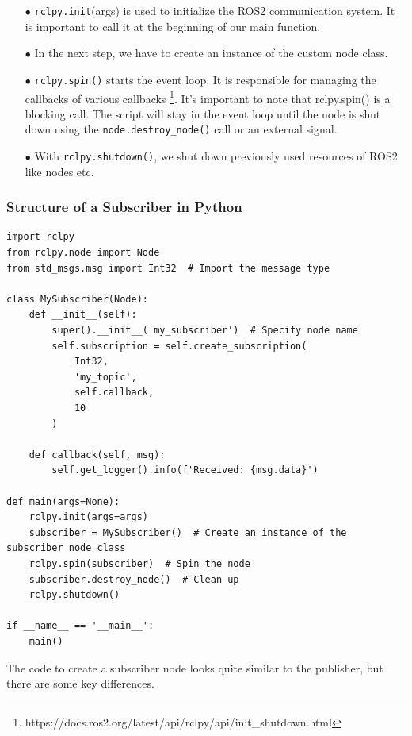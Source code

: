 \documentclass{article}
\begin{document}
\begin{enumerate}
\item[$\bullet$] \texttt{rclpy.init}(args) is used to initialize the ROS2 communication system. It is important to call it at the beginning of our main function.

\item[$\bullet$] In the next step, we have to create an instance of the custom node class.

\item[$\bullet$] \texttt{rclpy.spin()} starts the event loop. It is responsible for managing the callbacks of various callbacks \footnote{https://docs.ros2.org/latest/api/rclpy/api/init\_shutdown.html}. It's important to note that rclpy.spin() is a blocking call. The script will stay in the event loop until the node is shut down using the \texttt{node.destroy\_node()} call or an external signal.

\item[$\bullet$] With \texttt{rclpy.shutdown()}, we shut down previously used resources of ROS2 like nodes etc.
\end{enumerate}

\subsubsection{Structure of a Subscriber in Python}
\begin{verbatim}
import rclpy
from rclpy.node import Node
from std_msgs.msg import Int32  # Import the message type

class MySubscriber(Node):
    def __init__(self):
        super().__init__('my_subscriber')  # Specify node name
        self.subscription = self.create_subscription(
            Int32,
            'my_topic',
            self.callback,
            10
        )

    def callback(self, msg):
        self.get_logger().info(f'Received: {msg.data}')

def main(args=None):
    rclpy.init(args=args)
    subscriber = MySubscriber()  # Create an instance of the subscriber node class
    rclpy.spin(subscriber)  # Spin the node
    subscriber.destroy_node()  # Clean up
    rclpy.shutdown()

if __name__ == '__main__':
    main()
\end{verbatim}

\noindent
The code to create a subscriber node looks quite similar to the publisher, but there are some key differences.
    
\end{document}
